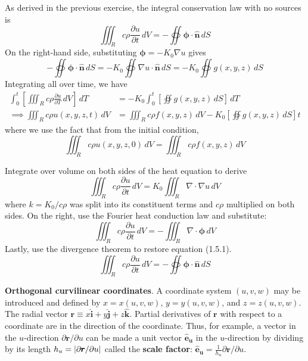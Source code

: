 \documentclass[a4paper]{article}
\begin{document}
As derived in the previous exercise, the integral conservation law with no sources is
\[
	\iiint_{R} c \rho \frac{\partial u}{\partial t} \, dV = -\oiint \pmb{\phi} \cdot \pmb{\hat{n}} \, dS 
\]
On the right-hand side, substituting \( \pmb{\phi} = -K_{0}\nabla u \) gives
\[
	-\oiint \pmb{\phi} \cdot \pmb{\hat{n}} \, dS = -K_{0}\oiint \nabla u \cdot \pmb{\hat{n}} \, dS = -K_{0} \oiint g \!\left( x,y,z \right) \, dS
\]
Integrating all over time, we have
\begin{align*}
	\int^{t}_{0} \!\left[ \iiint_{R} c \rho \frac{\partial u}{\partial T} \, dV \right] \, dT & = -K_{0}\int^{t}_{0} \!\left[ \oiint g \!\left( x,y,z \right) \, dS \right] \, dT \\
	\implies \iiint_{R} c \rho u \!\left( x,y,z,t \right) \, dV & = \iiint_{R} c \rho f \!\left( x,y,z \right) \, dV - K_{0}\!\left[ \oiint g \!\left( x,y,z \right) \, dS \right]t 
\end{align*}
where we use the fact that from the initial condition,
\[
	\iiint_{R} c \rho u \!\left( x,y,z,0 \right) \, dV = \iiint_{R} c \rho f \!\left( x,y,z \right) \, dV 
\]


Integrate over volume on both sides of the heat equation to derive
\[
	\iiint_{R} c \rho \frac{\partial u}{\partial t} \, dV = K_{0}\iiint_{R} \nabla \cdot \nabla u \, dV 
\]
where \( k = K_{0} / c \rho \) was split into its constituent terms and \( c \rho \) multiplied on both sides. On the right, use the Fourier heat conduction law and substitute:
\[
	\iiint_{R} c \rho \frac{\partial u}{\partial t} \, dV = -\iiint_{R} \nabla \cdot \pmb{\phi} \, dV 
\]
Lastly, use the divergence theorem to restore equation (1.5.1).
\[
	\iiint_{R} c \rho \frac{\partial u}{\partial t} \, dV = -\oiint \pmb{\phi} \cdot \pmb{\hat{n}} \, dS 
\]

\textbf{Orthogonal curvilinear coordinates}. A coordinate system \( \!\left( u,v,w \right) \) may be introduced and defined by \( x = x \!\left( u,v,w \right) \), \( y = y \!\left( u,v,w \right) \), and \( z = z \!\left( u,v,w \right) \). The radial vector \( \pmb{r} \equiv x \pmb{\hat{i}} + y \pmb{\hat{j}} + z \pmb{\hat{k}} \). Partial derivatives of \( \pmb{r} \) with respect to a coordinate are in the direction of the coordinate. Thus, for example, a vector in the \( u \)-direction \( \partial \pmb{r} / \partial u \) can be made a unit vector \( \pmb{\hat{e}_{u}} \) in the \( u \)-direction by dividing by its length \( h_{u} = \abs{\partial \pmb{r} / \partial u} \) called the \textbf{scale factor}: \( \pmb{\hat{e}_{u}} = \frac{1}{h_{u}}\partial \pmb{r} / \partial u \).
\end{document}
